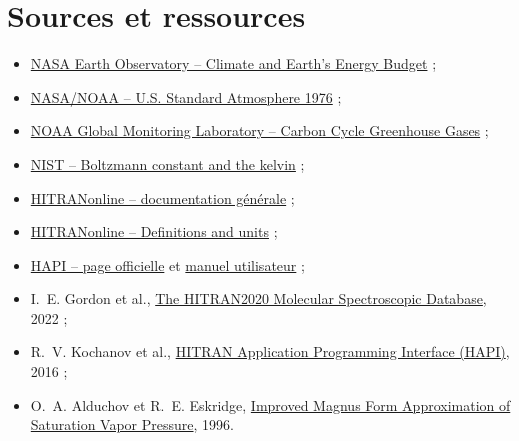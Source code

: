\documentclass[11pt,a4paper]{article}
\begin{document}
\section{Sources et ressources}

\begin{itemize}[leftmargin=*,itemsep=3pt]
  \item \href{https://science.nasa.gov/earth/earth-observatory/climate-and-earths-energy-budget/}{NASA Earth Observatory -- Climate and Earth's Energy Budget} ;
  \item \href{https://www.ngdc.noaa.gov/stp/space-weather/online-publications/miscellaneous/us-standard-atmosphere-1976/us-standard-atmosphere_st76-1562_noaa.pdf}{NASA/NOAA -- U.S. Standard Atmosphere 1976} ;
  \item \href{https://gml.noaa.gov/ccgg/}{NOAA Global Monitoring Laboratory -- Carbon Cycle Greenhouse Gases} ;
  \item \href{https://www.nist.gov/si-redefinition/kelvin/kelvin-boltzmann-constant}{NIST -- Boltzmann constant and the kelvin} ;
  \item \href{https://hitran.org/docs/}{HITRANonline -- documentation générale} ;
  \item \href{https://hitran.org/docs/definitions-and-units/}{HITRANonline -- Definitions and units} ;
  \item \href{https://hitran.org/hapi/}{HAPI -- page officielle} et
        \href{https://hitran.org/static/hapi/hapi_manual.pdf}{manuel utilisateur} ;
  \item I.~E. Gordon et al.,
        \href{https://doi.org/10.1016/j.jqsrt.2021.107949}{The HITRAN2020 Molecular Spectroscopic Database}, 2022 ;
  \item R.~V. Kochanov et al.,
        \href{https://doi.org/10.1016/j.jqsrt.2016.03.005}{HITRAN Application Programming Interface (HAPI)}, 2016 ;
  \item O.~A. Alduchov et R.~E. Eskridge,
        \href{https://doi.org/10.1175/1520-0450(1996)035\%3C0601:imfaos\%3E2.0.co;2}{Improved Magnus Form Approximation of Saturation Vapor Pressure}, 1996.
\end{itemize}
\end{document}
